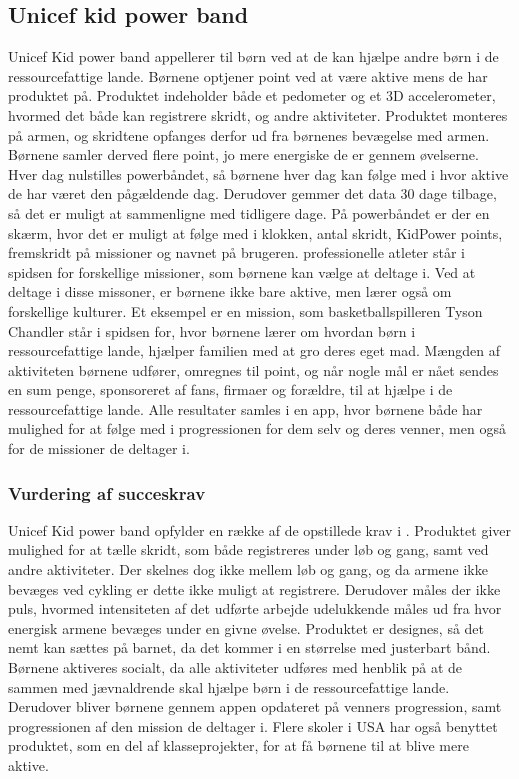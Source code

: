\subsection{Unicef kid power band}
Unicef Kid power band appellerer til børn ved at de kan hjælpe andre børn i de ressourcefattige lande. Børnene optjener point ved at være  aktive mens de har produktet på. Produktet indeholder både et pedometer og et 3D accelerometer, hvormed det både kan registrere skridt, og andre aktiviteter. Produktet monteres på armen, og skridtene opfanges derfor ud fra børnenes bevægelse med armen. Børnene samler derved flere point, jo mere energiske de er gennem øvelserne. Hver dag nulstilles powerbåndet, så børnene hver dag kan følge med i hvor aktive de har været den pågældende dag. Derudover gemmer det data 30 dage tilbage, så det er muligt at sammenligne med tidligere dage. På powerbåndet er der en skærm, hvor det er muligt at følge med i klokken, antal skridt, KidPower points, fremskridt på missioner og navnet på brugeren.\citep{PowerAbout2015,PowerManual2015} \newline 
professionelle atleter står i spidsen for forskellige missioner, som børnene kan vælge at deltage i. Ved at deltage i disse missoner, er børnene ikke bare aktive, men lærer også om forskellige kulturer. Et eksempel er en mission, som basketballspilleren Tyson Chandler står i spidsen for, hvor børnene lærer om hvordan børn i ressourcefattige lande, hjælper familien med at gro deres eget mad.\citep{PowerMission2015} \newline
Mængden af aktiviteten børnene udfører, omregnes til point, og når nogle mål er nået sendes en sum penge, sponsoreret af fans, firmaer og forældre, til at hjælpe i de ressourcefattige lande. \newline
Alle resultater samles i en app, hvor børnene både har mulighed for at følge med i progressionen for dem selv og deres venner, men også for de missioner de deltager i.\citep{PowerAbout2015}


\subsubsection{Vurdering af succeskrav}
Unicef Kid power band opfylder en række af de opstillede krav i . Produktet giver mulighed for at tælle skridt, som både registreres under løb og gang, samt ved andre aktiviteter. Der skelnes dog ikke mellem løb og gang, og da armene ikke bevæges ved cykling er dette ikke muligt at registrere. Derudover måles der ikke puls, hvormed intensiteten af det udførte arbejde udelukkende måles ud fra hvor energisk armene bevæges under en givne øvelse. Produktet er designes, så det nemt kan sættes på barnet, da det kommer i en størrelse med justerbart bånd.\citep{PowerManual2015} \newline
Børnene aktiveres socialt, da alle aktiviteter udføres med henblik på at de sammen med jævnaldrende skal hjælpe børn i de ressourcefattige lande. Derudover bliver børnene gennem appen opdateret på venners progression, samt progressionen af den mission de deltager i. Flere skoler i USA har også benyttet produktet, som en del af klasseprojekter, for at få børnene til at blive mere aktive.\citep{PowerAbout2015}

